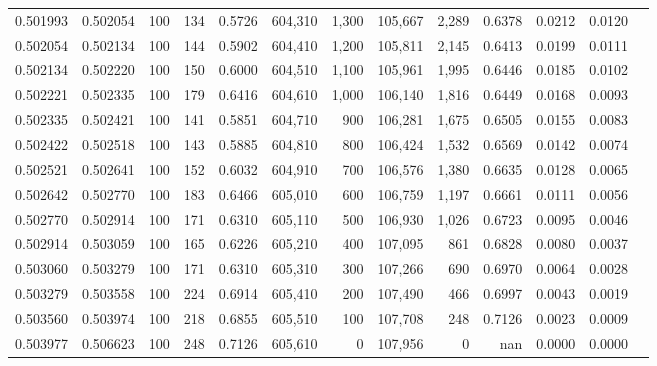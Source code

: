 \begin{tabular}{rrrrrrrrrrrrr}
0.501993 & 0.502054 &   100 & 134 &                                     0.5726 & 604,310 &   1,300 & 105,667 &   2,289 & 0.6378 & 0.0212 & 0.0120 \\
0.502054 & 0.502134 &   100 & 144 &                                     0.5902 & 604,410 &   1,200 & 105,811 &   2,145 & 0.6413 & 0.0199 & 0.0111 \\
0.502134 & 0.502220 &   100 & 150 &                                     0.6000 & 604,510 &   1,100 & 105,961 &   1,995 & 0.6446 & 0.0185 & 0.0102 \\
0.502221 & 0.502335 &   100 & 179 &                                     0.6416 & 604,610 &   1,000 & 106,140 &   1,816 & 0.6449 & 0.0168 & 0.0093 \\
0.502335 & 0.502421 &   100 & 141 &                                     0.5851 & 604,710 &     900 & 106,281 &   1,675 & 0.6505 & 0.0155 & 0.0083 \\
0.502422 & 0.502518 &   100 & 143 &                                     0.5885 & 604,810 &     800 & 106,424 &   1,532 & 0.6569 & 0.0142 & 0.0074 \\
0.502521 & 0.502641 &   100 & 152 &                                     0.6032 & 604,910 &     700 & 106,576 &   1,380 & 0.6635 & 0.0128 & 0.0065 \\
0.502642 & 0.502770 &   100 & 183 &                                     0.6466 & 605,010 &     600 & 106,759 &   1,197 & 0.6661 & 0.0111 & 0.0056 \\
0.502770 & 0.502914 &   100 & 171 &                                     0.6310 & 605,110 &     500 & 106,930 &   1,026 & 0.6723 & 0.0095 & 0.0046 \\
0.502914 & 0.503059 &   100 & 165 &                                     0.6226 & 605,210 &     400 & 107,095 &     861 & 0.6828 & 0.0080 & 0.0037 \\
0.503060 & 0.503279 &   100 & 171 &                                     0.6310 & 605,310 &     300 & 107,266 &     690 & 0.6970 & 0.0064 & 0.0028 \\
0.503279 & 0.503558 &   100 & 224 &                                     0.6914 & 605,410 &     200 & 107,490 &     466 & 0.6997 & 0.0043 & 0.0019 \\
0.503560 & 0.503974 &   100 & 218 &                                     0.6855 & 605,510 &     100 & 107,708 &     248 & 0.7126 & 0.0023 & 0.0009 \\
0.503977 & 0.506623 &   100 & 248 &                                     0.7126 & 605,610 &       0 & 107,956 &       0 &    nan & 0.0000 & 0.0000 \\
\bottomrule
\end{tabular}
